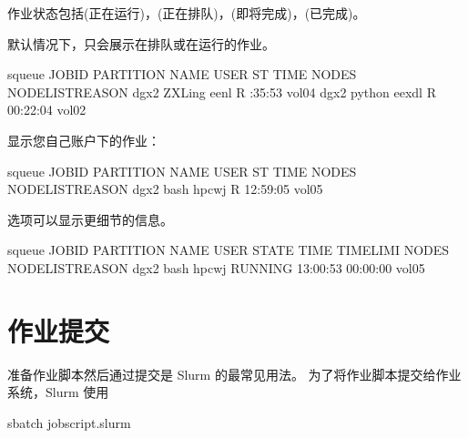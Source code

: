 \documentclass[a4paper,12pt,english]{sphinxmanual}
\begin{document}
\sphinxAtStartPar
作业状态包括(正在运行)，(正在排队)，(即将完成)，(已完成)。

\sphinxAtStartPar
默认情况下，只会展示在排队或在运行的作业。

\begin{sphinxVerbatim}[commandchars=\\\{\}]
\PYGZdl{} squeue
JOBID PARTITION     NAME     USER ST       TIME  NODES NODELISTREASON
      dgx2   ZXLing     eenl  R    :35:53       vol04
      dgx2   python    eexdl  R \PYGZhy{}00:22:04       vol02
\end{sphinxVerbatim}

\sphinxAtStartPar
显示您自己账户下的作业：

\begin{sphinxVerbatim}[commandchars=\\\{\}]
squeue
JOBID PARTITION     NAME     USER ST       TIME  NODES NODELISTREASON
      dgx2     bash    hpcwj  R \PYGZhy{}12:59:05       vol05
\end{sphinxVerbatim}

\sphinxAtStartPar
{}选项可以显示更细节的信息。

\begin{sphinxVerbatim}[commandchars=\\\{\}]
squeue
JOBID PARTITION     NAME     USER    STATE       TIME TIME\PYGZus{}LIMI  NODES NODELISTREASON
      dgx2     bash    hpcwj  RUNNING \PYGZhy{}13:00:53 \PYGZhy{}00:00:00     vol05
\end{sphinxVerbatim}


\section{ 作业提交}
\label{\detokenize{job/index:sbatch}}
\sphinxAtStartPar
准备作业脚本然后通过提交是 Slurm 的最常见用法。
为了将作业脚本提交给作业系统，Slurm 使用

\begin{sphinxVerbatim}[commandchars=\\\{\}]
\PYGZdl{} sbatch jobscript.slurm
\end{sphinxVerbatim}
\end{document}
